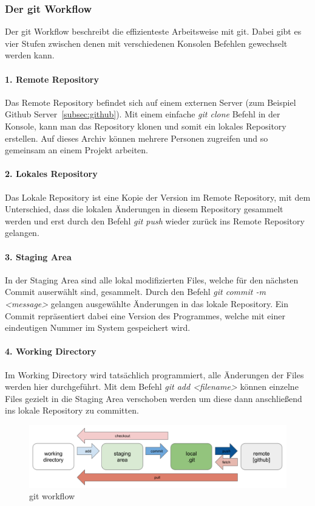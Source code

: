 \subsubsection{Der git Workflow}
Der git Workflow beschreibt die effizienteste Arbeitsweise mit git.
Dabei gibt es vier Stufen zwischen denen mit verschiedenen Konsolen Befehlen gewechselt werden kann.

\paragraph{1. Remote Repository}
Das Remote Repository befindet sich auf einem externen Server (zum Beispiel Github Server~\ref{subsec:github}).
Mit einem einfache \emph{git clone} Befehl in der Konsole, kann man das Repository klonen und somit ein lokales Repository erstellen.
Auf dieses Archiv können mehrere Personen zugreifen und so gemeinsam an einem Projekt arbeiten.

\paragraph{2. Lokales Repository}
Das Lokale Repository ist eine Kopie der Version im Remote Repository, mit dem Unterschied, dass die lokalen Änderungen in
diesem Repository gesammelt werden und erst durch den Befehl \emph{git push} wieder zurück ins Remote Repository gelangen.

\paragraph{3. Staging Area}
In der Staging Area sind alle lokal modifizierten Files, welche für den nächsten Commit auserwählt sind, gesammelt.
Durch den Befehl \emph{git commit -m <message>} gelangen ausgewählte Änderungen in das lokale Repository.
Ein Commit repräsentiert dabei eine Version des Programmes, welche mit einer eindeutigen Nummer im System gespeichert wird.

\paragraph{4. Working Directory}
Im Working Directory wird tatsächlich programmiert, alle Änderungen der Files werden hier durchgeführt.
Mit dem Befehl \emph{git add <filename>} können einzelne Files gezielt in die Staging Area verschoben werden um diese
dann anschließend ins lokale Repository zu committen.

\begin{figure}[hbt!]
    \centering
    \includegraphics[scale=0.4]{pics/git-workflow}
    \caption{git workflow~\cite{git-workflow}}
    \label{fig:git-workflow}
\end{figure}

